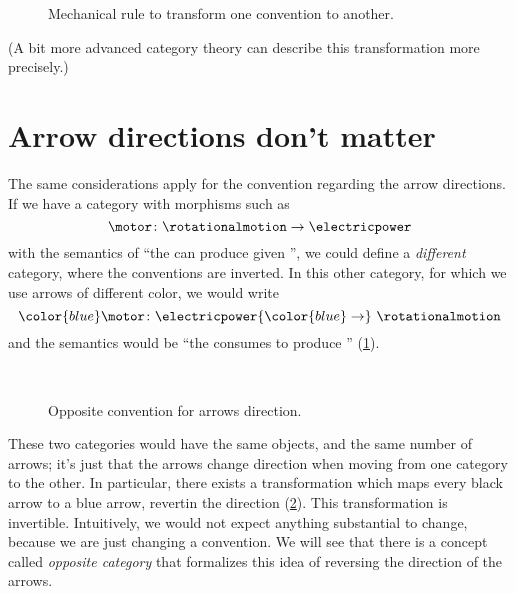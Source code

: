 \begin{figure*}[h]
	\begin{center}
	\end{center}
	\caption{Mechanical rule to transform one convention to another.}
\end{figure*}

(A bit more advanced category theory can describe this transformation more precisely.)

\section{Arrow directions don't matter}
The same considerations apply for the convention regarding the arrow directions.
If we have a category with morphisms such as
\begin{equation*}
	\motor \colon \rotationalmotion \to \electricpower
\end{equation*}
with the semantics of ``the \motor can produce \rotationalmotion given \electricpower'', we could define a \emph{different} category, where the conventions are inverted.
In this other category, for which we use arrows of different color, we would write
\begin{equation*}
	{\color{blue}\motor}
	\colon \electricpower {\color{blue} \to}\  \rotationalmotion
\end{equation*}
and the semantics would be ``the \motor consumes \electricpower to produce \rotationalmotion'' (\cref{fig:inverted}).

\begin{figure}[h!]
	\centering
	\\[+15pt]
	\caption{Opposite convention for arrows direction. }
	\label{fig:inverted}
\end{figure}

These two categories would have the same objects, and the same number of arrows; it's just that the arrows change direction when moving from one category to the other.
In particular, there exists a transformation which maps every black arrow to a blue arrow, revertin the direction (\cref{fig:inverted_2}).
This transformation is invertible.
Intuitively, we would not expect anything substantial to change, because we are just changing a convention.
We will see that there is a concept called \emph{opposite category} that formalizes this idea of reversing the direction of the arrows.

\begin{figure}[h!]
	\centering
	\caption{}
	\label{fig:inverted_2}
\end{figure}

